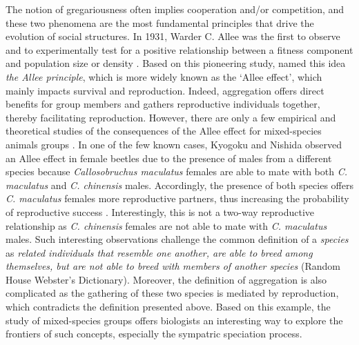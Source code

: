The notion of gregariousness often implies cooperation and/or competition, and these two phenomena are the most fundamental principles that drive the evolution of social structures. In 1931, Warder C. Allee \cite{allee_animal_1931} was the first to observe and to experimentally test for a positive relationship between a fitness component and population size or density \citep{stephens_consequences_1999,courchamp_allee_2008}. Based on this pioneering study, \citet{odum_fundamentals_1953} named this idea \textit{the Allee principle}, which is more widely known as the ‘Allee effect’, which mainly impacts survival and reproduction. Indeed, aggregation offers direct benefits for group members and gathers reproductive individuals together, thereby facilitating reproduction. However, there are only a few empirical and theoretical studies of the consequences of the Allee effect for mixed-species animals groups \cite{courchamp_inverse_1999}. In one of the few known cases, Kyogoku and Nishida \cite{kyogoku_presence_2012} observed an Allee effect in female beetles due to the presence of males from a different species because \textit{Callosobruchus maculatus} females are able to mate with both \textit{C. maculatus} and \textit{C. chinensis} males. Accordingly, the presence of both species offers \textit{C. maculatus} females more reproductive partners, thus increasing the probability of reproductive success \cite{kyogoku_presence_2012}. Interestingly, this is not a two-way reproductive relationship as \textit{C. chinensis} females are not able to mate with \textit{C. maculatus} males. Such interesting observations challenge the common definition of a \textit{species} as \textit{related individuals that resemble one another, are able to breed among themselves, but are not able to breed with members of another species} (Random House Webster’s Dictionary). Moreover, the definition of aggregation is also complicated as the gathering of these two species is mediated by reproduction, which contradicts the definition presented above. Based on this example, the study of mixed-species groups offers biologists an interesting way to explore the frontiers of such concepts, especially the sympatric speciation process. 


